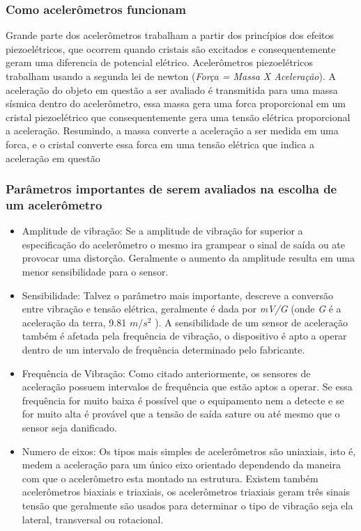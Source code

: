 \subsubsection{Como acelerômetros funcionam}
Grande parte dos acelerômetros trabalham a partir dos princípios dos efeitos piezoelétricos, que ocorrem quando cristais são excitados e consequentemente geram uma diferencia de potencial elétrico.  Acelerômetros piezoelétricos trabalham usando a segunda lei de newton (\textit{Força = Massa X Aceleração}). A aceleração do objeto em questão a ser avaliado é transmitida para uma massa sísmica dentro do acelerômetro, essa massa gera uma forca proporcional em um cristal piezoelétrico que consequentemente gera uma tensão elétrica proporcional a aceleração. Resumindo, a massa converte a aceleração a ser medida em uma forca, e o cristal converte essa forca em uma tensão elétrica que indica a aceleração em questão
\subsubsection{Parâmetros importantes de serem avaliados na escolha de um acelerômetro}
\begin{itemize}
\item Amplitude de vibração: Se a amplitude de vibração for superior a especificação do acelerômetro o mesmo ira grampear o sinal de saída ou ate provocar uma distorção. Geralmente o aumento da amplitude resulta em uma menor sensibilidade para o sensor. 
\item Sensibilidade: Talvez o parâmetro mais importante, descreve a conversão entre vibração e tensão elétrica, geralmente é dada por \textit{mV/G} (onde \textit{G} é a aceleração da terra, 9.81 $m/s^2$ ). A sensibilidade de um sensor de aceleração também é afetada pela frequência de vibração, o dispositivo é apto a operar dentro de um intervalo de frequência determinado pelo fabricante.
\item Frequência de Vibração: Como citado anteriormente, os sensores de aceleração possuem intervalos de frequência que estão aptos a operar. Se essa frequência for muito baixa é possível que o equipamento nem a detecte e se for muito alta é provável que a tensão de saída sature ou até mesmo que o sensor seja danificado.
\item Numero de eixos: Os tipos mais simples de acelerômetros são uniaxiais, isto é, medem a aceleração para um único eixo orientado dependendo da maneira com que o acelerômetro esta montado na estrutura. Existem também acelerômetros biaxiais e triaxiais, os acelerômetros triaxiais geram três sinais tensão que geralmente são usados para determinar o tipo de vibração seja ela lateral, transversal ou rotacional.
\end{itemize}
